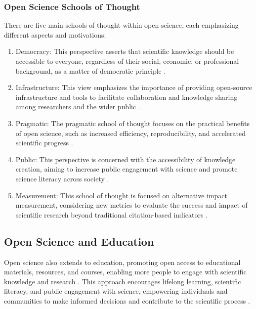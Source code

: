 \documentclass{IEEEtran}
\begin{document}
\subsubsection*{Open Science Schools of Thought}
There are five main schools of thought within open science, each emphasizing different aspects and motivations:

\begin{enumerate}
\item Democracy: This perspective asserts that scientific knowledge should be accessible to everyone, regardless of their social, economic, or professional background, as a matter of democratic principle \cite{fecher2014openscience}.

\item Infrastructure: This view emphasizes the importance of providing open-source infrastructure and tools to facilitate collaboration and knowledge sharing among researchers and the wider public \cite{fecher2014openscience}.

\item Pragmatic: The pragmatic school of thought focuses on the practical benefits of open science, such as increased efficiency, reproducibility, and accelerated scientific progress \cite{fecher2014openscience}.

\item Public: This perspective is concerned with the accessibility of knowledge creation, aiming to increase public engagement with science and promote science literacy across society \cite{fecher2014openscience}.

\item Measurement: This school of thought is focused on alternative impact measurement, considering new metrics to evaluate the success and impact of scientific research beyond traditional citation-based indicators \cite{fecher2014openscience}.

\end{enumerate}

\subsection{Open Science and Education}
Open science also extends to education, promoting open access to educational materials, resources, and courses, enabling more people to engage with scientific knowledge and research \cite{wiley2014open}. This approach encourages lifelong learning, scientific literacy, and public engagement with science, empowering individuals and communities to make informed decisions and contribute to the scientific process \cite{fecher2014openscience}.
\end{document}
